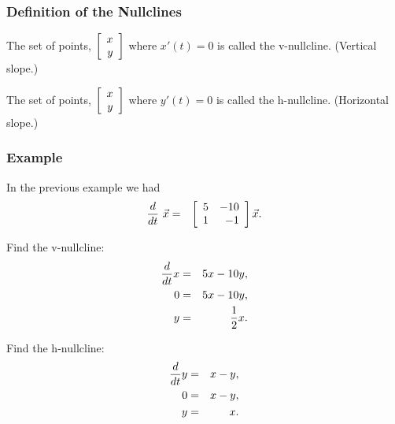 \begin{frame}
  \frametitle{Definition of the Nullclines}

  The set of points, $\vecTwo{x}{y}$ where $x'(t)=0$ is called the v-nullcline. (Vertical slope.)

  The set of points, $\vecTwo{x}{y}$ where $y'(t)=0$ is called the h-nullcline. (Horizontal slope.)

\end{frame}


\begin{frame}
  \frametitle{Example}
  
  In the previous example we had
  \begin{eqnarray*}
    \deriv{~}{t} \vec{x} & = & \arrayTwo{5}{-10}{1}{-1} \vec{x}.
  \end{eqnarray*}

  {
    Find the v-nullcline:
    \begin{eqnarray*}
      \deriv{x}{t} & = & 5x - 10y, \\
      0 & = & 5x - 10y, \\
      y & = & \frac{1}{2} x.
    \end{eqnarray*}
  }

  {
    Find the h-nullcline:
    \begin{eqnarray*}
      \deriv{y}{t} & = & x - y, \\
      0 & = & x - y, \\
      y & = &  x.
    \end{eqnarray*}
  }


\end{frame}



